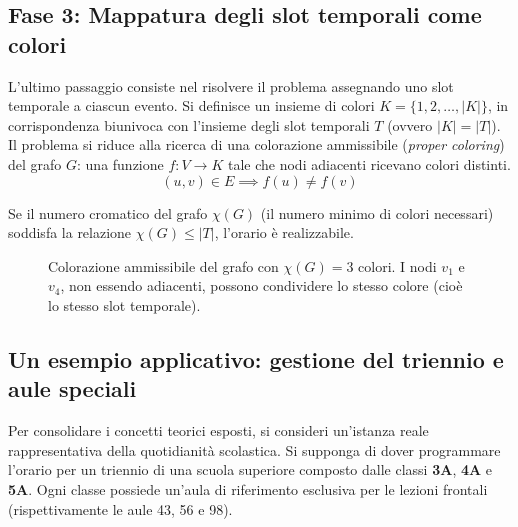 \subsection*{Fase 3: Mappatura degli slot temporali come colori}
\label{subsec:mappatura-colori}

L'ultimo passaggio consiste nel risolvere il problema assegnando uno slot
temporale a ciascun evento. Si definisce un insieme di colori $K = \{1, 2,
\dots, |K|\}$, in corrispondenza biunivoca con l'insieme degli slot temporali
$T$ (ovvero $|K| = |T|$). Il problema si riduce alla ricerca di una colorazione
ammissibile (\textit{proper coloring}) del grafo $G$: una funzione $f: V \to K$
tale che nodi adiacenti ricevano colori distinti.
\begin{equation}
(u, v) \in E \implies f(u) \neq f(v)
\end{equation}

Se il numero cromatico del grafo $\chi(G)$ (il numero minimo di colori
necessari) soddisfa la relazione $\chi(G) \le |T|$, l'orario è realizzabile.

\begin{figure}[htbp]
    \centering
    \caption{Colorazione ammissibile del grafo con $\chi(G) = 3$ colori. I nodi $v_1$ e $v_4$, non essendo adiacenti, possono condividere lo stesso colore (cioè lo stesso slot temporale).}
    \label{fig:grafo-colorato}
\end{figure}
\newpage
\subsection*{Un esempio applicativo: gestione del triennio e aule speciali}
\label{subsec:esempio-triennio}

Per consolidare i concetti teorici esposti, si consideri un'istanza reale
rappresentativa della quotidianità scolastica. Si supponga di dover programmare
l'orario per un triennio di una scuola superiore composto dalle classi
\textbf{3A}, \textbf{4A} e \textbf{5A}. Ogni classe possiede un'aula di
riferimento esclusiva per le lezioni frontali (rispettivamente le aule 43, 56 e
98). 

